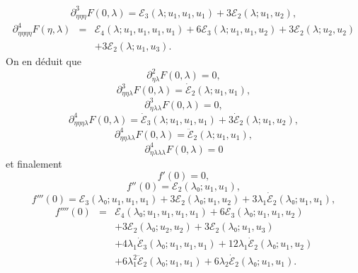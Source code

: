 \documentclass{article}
\begin{document}
\begin{equation} \partial_{η  η  η}^3 F (0, λ) =ℰ_3
   (λ ; u_1, u_1, u_1) + 3ℰ_2 (λ ; u_1, u_2), \end{equation}
\begin{eqnarray}
  \partial_{η  η  η  η}^4 F (η,
  λ) & = & ℰ_4 (λ ; u_1, u_1, u_1, u_1) + 6ℰ_3
  (λ ; u_1, u_1, u_2) + 3ℰ_2 (λ ; u_2, u_2) \nonumber\\
  &  &  + 3ℰ_2 (λ ; u_1, u_3) . \nonumber
\end{eqnarray}
On en déduit que
\begin{equation} \partial_{η  λ}^2 F (0, λ) = 0, \end{equation}
\begin{equation} \partial_{η  η  λ}^3 F (0, λ) =
   \dot{ℰ}_2 (λ ; u_1, u_1), \end{equation}
\begin{equation} \partial_{η  λ  λ}^3 F (0, λ) = 0, \end{equation}
\begin{equation} \partial_{η  η  η  λ}^4 F (0,
   λ) = \dot{ℰ}_3 (λ ; u_1, u_1, u_1) + 3
   \dot{ℰ}_2 (λ ; u_1, u_2), \text{} \text{} \end{equation}
\begin{equation} \partial_{η  η  λ  λ}^4 F (0,
   λ) = \ddot{ℰ}_2 (λ ; u_1, u_1), \end{equation}
\begin{equation} \partial_{η  λ  λ  λ}^4 F (0,
   λ) = 0 \end{equation}
et finalement
\begin{equation} f' (0) = 0, \end{equation}
\begin{equation} f'' (0) =ℰ_2 (λ₀ ; u_1, u_1), \end{equation}
\begin{equation} f''' (0) =ℰ_3 (λ₀ ; u_1, u_1, u_1) + 3ℰ_2
   (λ₀ ; u_1, u_2) + 3 λ_1  \dot{ℰ}_2 (λ₀ ; u_1,
   u_1), \end{equation}
\begin{eqnarray}
  f'''' (0) & = & ℰ_4 (λ₀ ; u_1, u_1, u_1, u_1) +
  6ℰ_3 (λ₀ ; u_1, u_1, u_2) \nonumber\\
  &  &  + 3ℰ_2 (λ₀ ; u_2, u_2) + 3ℰ_2
  (λ₀ ; u_1, u_3) \nonumber\\
  &  &  + 4 λ_1  \dot{ℰ}_3 (λ₀ ; u_1, u_1,
  u_1) + 12 λ_1  \dot{ℰ}_2 (λ₀ ; u_1, u_2) \nonumber\\
  &  &  + 6 λ_1^2  \ddot{ℰ}_2 (λ₀ ; u_1, u_1)
  + 6 λ_2  \dot{ℰ}_2 (λ₀ ; u_1, u_1) . \nonumber
\end{eqnarray}
\end{document}
